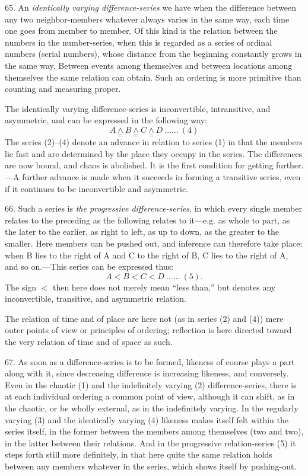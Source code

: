 \documentclass[12pt,a4paper]{book}
\newcommand{\opage}[1]{\marginnote{\footnotesize\textit{[#1]}}}
\begin{document}
65. An \emph{identically varying difference-series} we have when the
difference between any two neighbor-members whatever always varies in the
same way, each time one goes from member to member. Of this kind is the
relation between the numbers in the number-series, when this is regarded as
a series of ordinal numbers (serial numbers), whose distance from the
beginning constantly grows in the same way. Between events among themselves
and between locations among themselves the same relation can obtain. Such an
ordering is more primitive than counting and measuring proper.

The identically varying difference-series is inconvertible, intransitive,
and asymmetric, and can be expressed in the following way:
\[ A \underset{=}{\wedge} B \underset{=}{\wedge} C \underset{=}{\wedge} D \ \ldots\ldots\ (4) \]
The series (2)--(4) denote an advance in relation to series (1) in that the
members lie fast and are determined by the place they occupy in the series.
The differences are now bound, and chaos is abolished. It is the first
condition for getting further.---A further advance is made when it succeeds
in forming a transitive series, even if it continues to be inconvertible and
asymmetric.

66. Such a series is \emph{the progressive difference-series}, in which
every single member relates to the preceding as the following relates to
it---e.g. as whole to part, as the later to the earlier, as right to left,
as up to down, as the greater to the smaller. Here members can be pushed
out, and inference can therefore take place: when B lies to the right of A
and C to the right of B, C lies to the right of A, and so on.---This series
can be expressed thus:
\[ A < B < C < D \ \ldots\ldots\ (5). \]
The sign $<$ then here does not merely mean ``less than,'' but denotes any
inconvertible, transitive, and asymmetric relation.

\opage{168}The relation of time and of place are here not (as in series (2) and (4))
mere outer points of view or principles of ordering; reflection is here
directed toward the very relation of time and of space as such.

67. As soon as a difference-series is to be formed, likeness of course plays
a part along with it, since decreasing difference is increasing likeness,
and conversely. Even in the chaotic (1) and the indefinitely varying (2)
difference-series, there is at each individual ordering a common point of
view, although it can shift, as in the chaotic, or be wholly external, as in
the indefinitely varying. In the regularly varying (3) and the identically
varying (4) likeness makes itself felt within the series itself, in the
former between the members among themselves (two and two), in the latter
between their relations. And in the progressive relation-series (5) it steps
forth still more definitely, in that here quite the same relation holds
between any members whatever in the series, which shows itself by
pushing-out.
\end{document}
